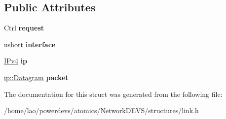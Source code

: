 \subsection*{Public Attributes}
\begin{DoxyCompactItemize}
\item 
Ctrl {\bfseries request}\hypertarget{structlink_1_1Control_afb4bed2321bc90a524872e03126342e9}{}\label{structlink_1_1Control_afb4bed2321bc90a524872e03126342e9}

\item 
ushort {\bfseries interface}\hypertarget{structlink_1_1Control_a9ad3f2480082b69e5b8ab59c4f04c6a3}{}\label{structlink_1_1Control_a9ad3f2480082b69e5b8ab59c4f04c6a3}

\item 
\hyperlink{structIPv4}{I\+Pv4} {\bfseries ip}\hypertarget{structlink_1_1Control_a0b7fcf55d5c517914373a1979fc87277}{}\label{structlink_1_1Control_a0b7fcf55d5c517914373a1979fc87277}

\item 
\hyperlink{structip_1_1Datagram}{ip\+::\+Datagram} {\bfseries packet}\hypertarget{structlink_1_1Control_aa67780caf362cd49f34b9357a2d86999}{}\label{structlink_1_1Control_aa67780caf362cd49f34b9357a2d86999}

\end{DoxyCompactItemize}


The documentation for this struct was generated from the following file\+:\begin{DoxyCompactItemize}
\item 
/home/lao/powerdevs/atomics/\+Network\+D\+E\+V\+S/structures/link.\+h\end{DoxyCompactItemize}
